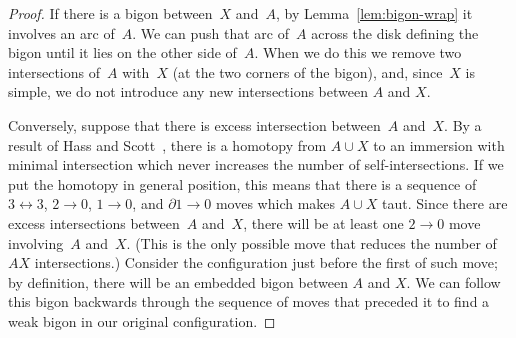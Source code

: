 \begin{proof}
  If there is a bigon between~$X$ and~$A$, by
  Lemma~\ref{lem:bigon-wrap} it involves an arc of~$A$.  We can
  push that arc of~$A$ across the disk defining the bigon until it
  lies on the other side of~$A$.  When we do this
  we remove two intersections of~$A$ with~$X$ (at the two corners of
  the bigon), and, since~$X$ is simple, we do not introduce any new
  intersections between $A$ and $X$.

  Conversely, suppose that there is excess intersection between~$A$
  and~$X$.  By a result of Hass and
  Scott~\cite[Theorem~2.2]{HS94:ShorteningCurves}, there is a homotopy
  from $A \cup X$ to an immersion with minimal intersection which never
  increases the number of self-intersections.  If we put the homotopy
  in general position, this means that there is a sequence of $3\leftrightarrow3$,
  $2\to0$, $1\to0$, and $\partial 1\to0$ moves which makes $A\cup X$ taut.
  Since there are excess intersections between~$A$ and~$X$, there will
  be at least one $2\to0$ move involving~$A$ and~$X$.  (This is the only
  possible move that reduces the number of $AX$ intersections.)
  Consider the configuration just before the first of such move; by
  definition, there will be an embedded bigon between $A$ and $X$.  We
  can follow this bigon backwards through the sequence of moves that
  preceded it to find a weak bigon in our original configuration.%
\end{proof}


